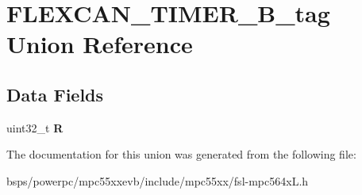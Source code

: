 \hypertarget{unionFLEXCAN__TIMER__32B__tag}{}\section{F\+L\+E\+X\+C\+A\+N\+\_\+\+T\+I\+M\+E\+R\+\_\+B\+\_\+tag Union Reference}
\label{unionFLEXCAN__TIMER__32B__tag}
\subsection*{Data Fields}
\begin{DoxyCompactItemize}
\item 
\mbox{\label{unionFLEXCAN__TIMER__32B__tag_a6f45e1d800234eaeaa075922b643243c}} 
uint32\+\_\+t {\bfseries R}
\end{DoxyCompactItemize}


The documentation for this union was generated from the following file\+:\begin{DoxyCompactItemize}
\item 
bsps/powerpc/mpc55xxevb/include/mpc55xx/fsl-\/mpc564x\+L.\+h\end{DoxyCompactItemize}
